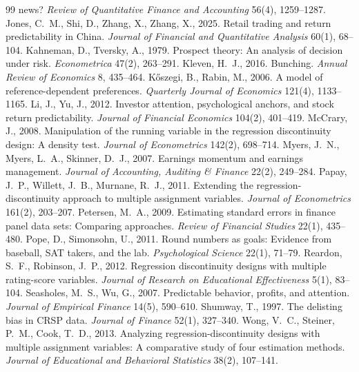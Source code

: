 \documentclass[11pt]{article}
\begin{document}
\begin{thebibliography}{99}
news? \emph{Review of Quantitative Finance and Accounting} 56(4), 1259--1287.
 Jones, C.~M., Shi, D., Zhang, X., Zhang, X., 2025. Retail trading and return
predictability in China. \emph{Journal of Financial and Quantitative Analysis} 60(1), 68--104.
 Kahneman, D., Tversky, A., 1979. Prospect theory: An analysis of
decision under risk. \emph{Econometrica} 47(2), 263--291.
 Kleven, H.~J., 2016. Bunching. \emph{Annual Review of Economics} 8, 435--464.
 K\H{o}szegi, B., Rabin, M., 2006. A model of reference-dependent
preferences. \emph{Quarterly Journal of Economics} 121(4), 1133--1165.
 Li, J., Yu, J., 2012. Investor attention, psychological anchors, and stock return
predictability. \emph{Journal of Financial Economics} 104(2), 401--419.
 McCrary, J., 2008. Manipulation of the running variable in the regression
discontinuity design: A density test. \emph{Journal of Econometrics} 142(2), 698--714.
 Myers, J.~N., Myers, L.~A., Skinner, D.~J., 2007. Earnings momentum and earnings
management. \emph{Journal of Accounting, Auditing \& Finance} 22(2), 249--284.
 Papay, J.~P., Willett, J.~B., Murnane, R.~J., 2011. Extending the
regression-discontinuity approach to multiple assignment variables. \emph{Journal of Econometrics} 161(2), 203--207.
 Petersen, M.~A., 2009. Estimating standard errors in finance panel data sets:
Comparing approaches. \emph{Review of Financial Studies} 22(1), 435--480.
 Pope, D., Simonsohn, U., 2011. Round numbers as goals: Evidence from
baseball, SAT takers, and the lab. \emph{Psychological Science} 22(1), 71--79.
 Reardon, S.~F., Robinson, J.~P., 2012. Regression discontinuity designs
with multiple rating-score variables. \emph{Journal of Research on Educational Effectiveness} 5(1), 83--104.
 Seasholes, M.~S., Wu, G., 2007. Predictable behavior, profits, and
attention. \emph{Journal of Empirical Finance} 14(5), 590--610.
 Shumway, T., 1997. The delisting bias in CRSP data. \emph{Journal of Finance} 52(1),
327--340.
 Wong, V.~C., Steiner, P.~M., Cook, T.~D., 2013. Analyzing regression-discontinuity
designs with multiple assignment variables: A comparative study of four estimation methods. \emph{Journal of
Educational and Behavioral Statistics} 38(2), 107--141.
\end{thebibliography}
\end{document}
